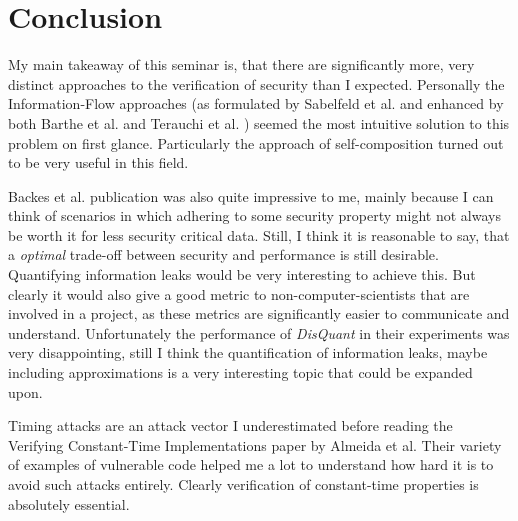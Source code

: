 \documentclass[a4paper,UKenglish]{lipics-v2018}
\begin{document}
\section{Conclusion}

My main takeaway of this seminar is, that there are significantly more, very distinct approaches to the verification of security than I expected. Personally the Information-Flow approaches (as formulated by Sabelfeld et al.\cite{language_based_information_flow_security} and enhanced by both Barthe et al.\cite{information_flow_by_self_composition} and Terauchi et al. \cite{secure_information_flow_safety}) seemed the most intuitive solution to this problem on first glance. Particularly the approach of self-composition turned out to be very useful in this field.

Backes et al. publication was also quite impressive to me, mainly because I can think of scenarios in which adhering to some security property might not always be worth it for less security critical data. Still, I think it is reasonable to say, that a \textit{optimal} trade-off between security and performance is still desirable. Quantifying information leaks would be very interesting to achieve this. But clearly it would also give a good metric to non-computer-scientists that are involved in a project, as these metrics are significantly easier to communicate and understand. Unfortunately the performance of \textit{DisQuant} in their experiments was very disappointing, still I think the quantification of information leaks, maybe including approximations is a very interesting topic that could be expanded upon.

Timing attacks are an attack vector I underestimated before reading the Verifying Constant-Time Implementations paper by Almeida et al.\cite{verifying_constant_time_implementations} Their variety of examples of vulnerable code helped me a lot to understand how hard it is to avoid such attacks entirely. Clearly verification of constant-time properties is absolutely essential.
\end{document}
